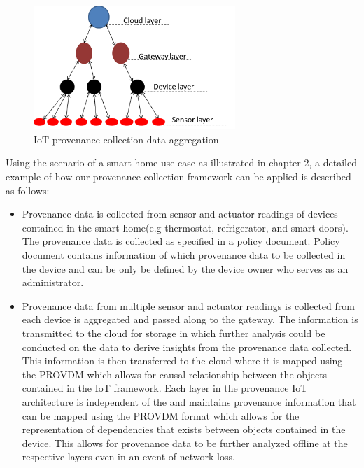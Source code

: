 \begin{figure}[h!]
\begin{center}

\includegraphics[width=3.0in]{iot.PNG}    
\end{center}
\caption{IoT provenance-collection data aggregation}
\label{autom}
\end{figure}


Using the scenario of a smart home use case as illustrated in chapter 2, a detailed example of how our provenance collection framework can be applied is described as follows:

\begin{itemize}

\item Provenance data is collected from sensor and actuator readings of devices contained in the smart home(e.g thermostat, refrigerator, and smart doors). The provenance data is collected as specified in a policy document. Policy document contains information of which provenance data to be collected in the device and can be only be defined by the device owner who serves as an administrator. 

\item Provenance data from multiple sensor and actuator readings is collected from each device is aggregated and passed along to the gateway. The information is transmitted to the cloud for storage in which further analysis could be conducted on the data to derive insights from the provenance data collected. This information is then transferred to the cloud where it is mapped using the PROV\-DM which allows for causal relationship between the objects contained in the IoT framework. Each layer in the provenance IoT architecture is independent of the and maintains provenance information that can be mapped using the PROV\-DM format which allows for the representation of dependencies that exists between objects contained in the device. This allows for provenance data to be further analyzed offline at the respective layers even in an event of network loss. 

\end{itemize}






